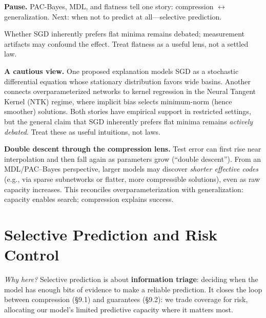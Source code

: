 \vspace{2em}


\vspace{1em}
\textbf{Pause.} PAC\mbox{-}Bayes, MDL, and flatness tell one story: compression $\leftrightarrow$ generalization. Next: when not to predict at all---selective prediction.
\vspace{1em}

\vspace{0.3cm}
Whether SGD inherently prefers flat minima remains debated; measurement artifacts may confound the effect. Treat flatness as a useful lens, not a settled law.

\vspace{0.3cm}
\textbf{A cautious view.} One proposed explanation models SGD as a stochastic differential equation whose stationary distribution favors wide basins.
Another connects overparameterized networks to kernel regression in the Neural Tangent Kernel (NTK) regime, where implicit bias selects minimum-norm (hence smoother) solutions.
Both stories have empirical support in restricted settings, but the general claim that SGD inherently prefers flat minima remains \emph{actively debated}. Treat these as useful intuitions, not laws.

\begin{keyinsight}
\textbf{Double descent through the compression lens.}
Test error can first rise near interpolation and then fall again as parameters grow (``double descent'').
From an MDL/PAC--Bayes perspective, larger models may discover \emph{shorter effective codes} (e.g., via sparse subnetworks or flatter, more compressible solutions), even as raw capacity increases.
This reconciles overparameterization with generalization: capacity enables search; compression explains success.
\end{keyinsight}

\vspace{1.2em}
\section{Selective Prediction and Risk Control}

\noindent\emph{Why here?}
Selective prediction is about \textbf{information triage}: deciding when the model has enough bits of evidence to make a reliable prediction.
It closes the loop between compression (\S9.1) and guarantees (\S9.2): we trade coverage for risk, allocating our model's limited predictive capacity where it matters most.

